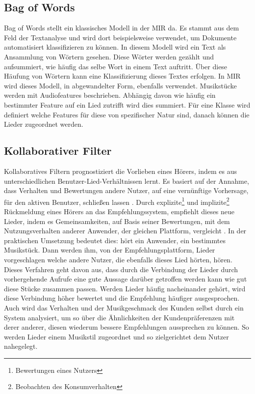 \documentclass[twosided,a4,10pt]{article}
\begin{document}
\begin{multicols}{2}
		\subsection{Bag of Words}
		Bag of Words stellt ein klassisches Modell in der MIR da. Es stammt aus dem Feld der Textanalyse und wird dort beispielsweise verwendet, um Dokumente automatisiert klassifizieren zu können. In diesem Modell wird ein Text als Ansammlung von Wörtern gesehen. Diese Wörter werden gezählt und aufsummiert, wie häufig das selbe Wort in einem Text auftritt. Über diese Häufung von Wörtern kann eine Klassifizierung dieses Textes erfolgen. \cite{bagofWordClassic} In MIR wird dieses Modell, in abgewandelter Form, ebenfalls verwendet. Musikstücke werden mit Audiofeatures beschrieben. Abhängig davon wie häufig ein bestimmter Feature auf ein Lied zutrifft wird dies summiert. Für eine Klasse wird definiert welche Features für diese von spezifischer Natur sind, danach können die Lieder zugeordnet werden. \cite{bagofWordMusicRecommondation}
		\subsection{Kollaborativer Filter}
		Kollaboratives Filtern prognostiziert die Vorlieben eines Hörers, indem es aus unterschiedlichen Benutzer-Lied-Verhältnissen lernt. Es basiert auf der Annahme, dass Verhalten und Bewertungen andere Nutzer, auf eine vernünftige Vorhersage, für den aktiven Benutzer, schließen lassen \cite{celma}. Durch explizite\footnote[4]{ Bewertungen eines Nutzers} und implizite\footnote[5]{Beobachten des Konsumverhalten} Rückmeldung eines Hörers an das Empfehlungssystem, empfiehlt dieses neue Lieder, indem es Gemeinsamkeiten, auf Basis seiner Bewertungen, mit dem Nutzungsverhalten anderer Anwender, der gleichen Plattform, vergleicht \cite{mcfee}.\newline
		In der praktischen Umsetzung bedeutet dies: hört ein Anwender, ein bestimmtes Musikstück. Dann werden ihm, von der Empfehlungsplattform, Lieder vorgeschlagen welche andere Nutzer, die ebenfalls dieses Lied hörten, hören. Dieses Verfahren geht davon aus, dass durch die Verbindung der Lieder durch vorhergehende Aufrufe eine gute Aussage darüber getroffen werden kann wie gut diese Stücke zusammen passen. Werden Lieder häufig nacheinander gehört, wird diese Verbindung höher bewertet und die Empfehlung häufiger ausgesprochen. Auch wird das Verhalten und der Musikgeschmack des Kunden selbst durch ein System analysiert, um so über die Ähnlichkeiten der Kundenpräferenzen mit derer anderer, diesen wiederum bessere Empfehlungen aussprechen zu können. So werden Lieder einem Musikstil zugeordnet und so zielgerichtet dem Nutzer nahegelegt.\cite{mcfee}\newline

\end{multicols}
\end{document}

